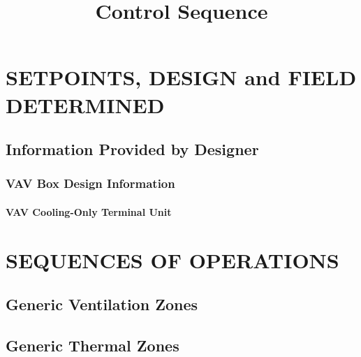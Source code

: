 \documentclass[10pt]{article}
\title{Control Sequence}
\author{}
\date{}
\begin{document}
\pagestyle{plain}

\maketitle

\renewcommand*\contentsname{\centering CONTENTS}

\newpage

\section{SETPOINTS, DESIGN and FIELD DETERMINED}
\subsection{Information Provided by Designer}

\addtocounter{subsubsection}{1}

\subsubsection{VAV Box Design Information}
\paragraph{VAV Cooling-Only Terminal Unit} \label{vav_cooling_only_terminal_unit}

\addtocounter{section}{1}  

\section{SEQUENCES OF OPERATIONS}

\addtocounter{subsection}{1}

\subsection{Generic Ventilation Zones} \label{generic_ventilation_zones}
\subsection{Generic Thermal Zones} \label{generic_thermal_zones}
\end{document}
